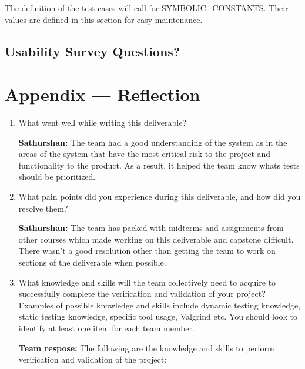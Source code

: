 \documentclass[12pt, titlepage]{article}
\begin{document}
The definition of the test cases will call for SYMBOLIC\_CONSTANTS.
Their values are defined in this section for easy maintenance.

\subsection{Usability Survey Questions?}


\newpage{}
\section*{Appendix --- Reflection}

\begin{enumerate}
  \item What went well while writing this deliverable?

  \textbf{Sathurshan:} The team had a good understanding of the system as in
  the areas of the system that have the most critical risk to the project and
  functionality to the product. As a result, it helped the team know whats tests
  should be prioritized.

  \item What pain points did you experience during this deliverable, and how
    did you resolve them?

  \textbf{Sathurshan:} The team has packed with midterms and assignments from
  other courses which made working on this deliverable and capstone difficult.
  There wasn't a good resolution other than getting the team to work on sections
  of the deliverable when possible.

  \item What knowledge and skills will the team collectively need to acquire to
  successfully complete the verification and validation of your project?
  Examples of possible knowledge and skills include dynamic testing knowledge,
  static testing knowledge, specific tool usage, Valgrind etc.  You should look
  to identify at least one item for each team member.
  
  \textbf{Team respose:} The following are the knowledge and skills to perform
  verification and validation of the project:


\end{enumerate}
\end{document}
